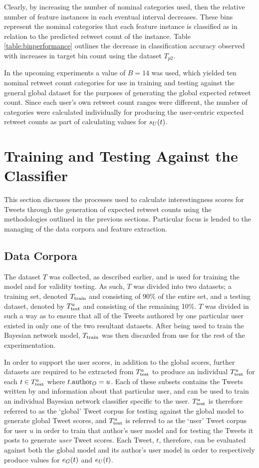 Clearly, by increasing the number of nominal categories used, then the relative number of feature instances in each eventual interval decreases. These bins represent the nominal categories that each feature instance is classified as in relation to the predicted retweet count of the instance. Table \ref{table:binperformance} outlines the decrease in classification accuracy observed with increases in target bin count using the dataset $T_{p2}$.

In the upcoming experiments a value of $B = 14$ was used, which yielded ten nominal retweet count categories for use in training and testing against the general global dataset for the purposes of generating the global expected retweet count. Since each user's own retweet count ranges were different, the number of categories were calculated individually for producing the user-centric expected retweet counts as part of calculating values for $s_U(t)$.


\section{Training and Testing Against the Classifier}
This section discusses the processes used to calculate interestingness scores for Tweets through the generation of expected retweet counts using the methodologies outlined in the previous sections. Particular focus is lended to the managing of the data corpora and feature extraction.


\subsection{Data Corpora}
The dataset $T$ was collected, as described earlier, and is used for training the model and for validity testing. As such, $T$  was divided into two datasets; a training set, denoted $T_{\textrm{train}}{}$ and consisting of 90\% of the entire set, and a testing dataset, denoted by $T^a_{\textrm{test}}{}$ and consisting of the remaining 10\%. $T$ was divided in such a way as to ensure that all of the Tweets authored by one particular user existed in only one of the two resultant datasets. After being used to train the Bayesian network model, $T_{\textrm{train}}{}$ was then discarded from use for the rest of the experimentation.

In order to support the user scores, in addition to the global scores, further datasets are required to be extracted from $T^a_{\textrm{test}}{}$ to produce an individual $T_{\textrm{test}}^u$ for each $t \in T^a_{\textrm{test}}{}$ where $t.\textrm{author}_O = u$. Each of these subsets contains the Tweets written by and information about that particular user, and can be used to train an individual Bayesian network classifier specific to the user. $T^a_{\textrm{test}}{}$ is therefore referred to as the `global' Tweet corpus for testing against the global model to generate global Tweet scores, and $T_{\textrm{test}}^u$ is referred to as the `user' Tweet corpus for user $u$ in order to train that author's user model and for testing the Tweets it posts to generate \textit{user} Tweet scores. Each Tweet, $t$, therefore, can be evaluated against both the global model and its author's user model in order to respectively produce values for $e_G(t)$ and $e_U(t)$.

